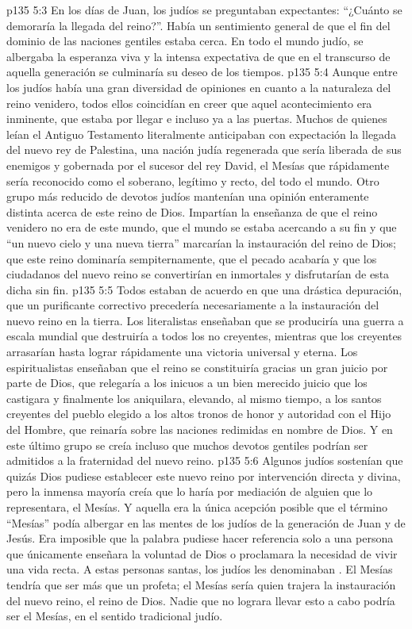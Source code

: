 \vs p135 5:3 En los días de Juan, los judíos se preguntaban expectantes: “¿Cuánto se demoraría la llegada del reino?”. Había un sentimiento general de que el fin del dominio de las naciones gentiles estaba cerca. En todo el mundo judío, se albergaba la esperanza viva y la intensa expectativa de que en el transcurso de aquella generación se culminaría su deseo de los tiempos.
\vs p135 5:4 Aunque entre los judíos había una gran diversidad de opiniones en cuanto a la naturaleza del reino venidero, todos ellos coincidían en creer que aquel acontecimiento era inminente, que estaba por llegar e incluso ya a las puertas. Muchos de quienes leían el Antiguo Testamento literalmente anticipaban con expectación la llegada del nuevo rey de Palestina, una nación judía regenerada que sería liberada de sus enemigos y gobernada por el sucesor del rey David, el Mesías que rápidamente sería reconocido como el soberano, legítimo y recto, del todo el mundo. Otro grupo más reducido de devotos judíos mantenían una opinión enteramente distinta acerca de este reino de Dios. Impartían la enseñanza de que el reino venidero no era de este mundo, que el mundo se estaba acercando a su fin y que “un nuevo cielo y una nueva tierra” marcarían la instauración del reino de Dios; que este reino dominaría sempiternamente, que el pecado acabaría y que los ciudadanos del nuevo reino se convertirían en inmortales y disfrutarían de esta dicha sin fin.
\vs p135 5:5 Todos estaban de acuerdo en que una drástica depuración, que un purificante correctivo precedería necesariamente a la instauración del nuevo reino en la tierra. Los literalistas enseñaban que se produciría una guerra a escala mundial que destruiría a todos los no creyentes, mientras que los creyentes arrasarían hasta lograr rápidamente una victoria universal y eterna. Los espiritualistas enseñaban que el reino se constituiría gracias un gran juicio por parte de Dios, que relegaría a los inicuos a un bien merecido juicio que los castigara y finalmente los aniquilara, elevando, al mismo tiempo, a los santos creyentes del pueblo elegido a los altos tronos de honor y autoridad con el Hijo del Hombre, que reinaría sobre las naciones redimidas en nombre de Dios. Y en este último grupo se creía incluso que muchos devotos gentiles podrían ser admitidos a la fraternidad del nuevo reino.
\vs p135 5:6 Algunos judíos sostenían que quizás Dios pudiese establecer este nuevo reino por intervención directa y divina, pero la inmensa mayoría creía que lo haría por mediación de alguien que lo representara, el Mesías. Y aquella era la única acepción posible que el término “Mesías” podía albergar en las mentes de los judíos de la generación de Juan y de Jesús. Era imposible que la palabra  pudiese hacer referencia solo a una persona que únicamente enseñara la voluntad de Dios o proclamara la necesidad de vivir una vida recta. A estas personas santas, los judíos les denominaban . El Mesías tendría que ser más que un profeta; el Mesías sería quien trajera la instauración del nuevo reino, el reino de Dios. Nadie que no lograra llevar esto a cabo podría ser el Mesías, en el sentido tradicional judío.
